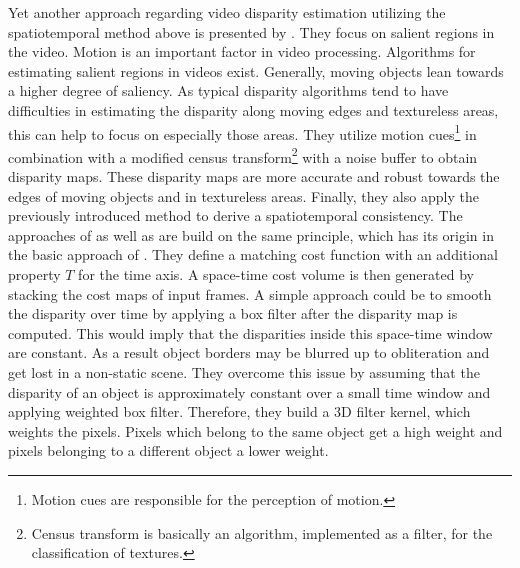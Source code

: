 \newline\newline\noindent Yet another approach regarding video disparity estimation utilizing the spatiotemporal method above is presented by \citeauthor{lee2012local} \citep{lee2012local}.
They focus on salient regions in the video.
Motion is an important factor in video processing.
Algorithms for estimating salient regions in videos exist.
Generally, moving objects lean towards a higher degree of saliency.
As typical disparity algorithms tend to have difficulties in estimating the disparity along moving edges and textureless areas, this can help to focus on especially those areas.
They utilize motion cues\footnote{Motion cues are responsible for the perception of motion.} in combination with a modified census transform\footnote{Census transform is basically an algorithm, implemented as a filter, for the classification of textures.} with a noise buffer to obtain disparity maps.
These disparity maps are more accurate and robust towards the edges of moving objects and in textureless areas.
Finally, they also apply the previously introduced method to derive a spatiotemporal consistency.
\noindent The approaches of \citeauthor{richardt2010real} \citep{richardt2010real} as well as \citeauthor{hosni2012temporally} \citep{hosni2012temporally} are build on the same principle, which has its origin in the basic approach of \citeauthor{davis2003spacetime} \citep{davis2003spacetime}.
They define a matching cost function with an additional property $T$ for the time axis.
A space-time cost volume is then generated by stacking the cost maps of input frames.
A simple approach could be to smooth the disparity over time by applying a box filter after the disparity map is computed.
This would imply that the disparities inside this space-time window are constant.
As a result object borders may be blurred up to obliteration and get lost in a non-static scene.
They overcome this issue by assuming that the disparity of an object is approximately constant over a small time window and applying weighted box filter.
Therefore, they build a 3D filter kernel, which weights the pixels.
Pixels which belong to the same object get a high weight and pixels belonging to a different object a lower weight.

